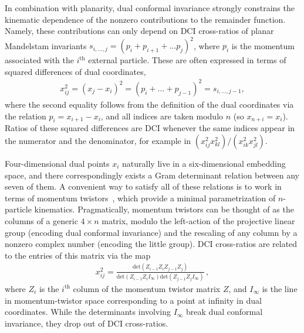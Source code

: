 \documentclass[11pt]{article}
\begin{document}
In combination with planarity, dual conformal invariance strongly constrains the kinematic dependence of the nonzero contributions to the remainder function. Namely, these contributions can only depend on DCI cross-ratios of planar Mandelstam invariants $s_{i,\dots,j} = (p_i + p_{i+1} + \dots p_{j})^2$, where $p_i$ is the momentum associated with the $i^{\text{th}}$ external particle. These are often expressed in terms of squared differences of dual coordinates, 
\begin{align}
x_{ij}^2 = (x_j - x_i)^2 = (p_i+ \dots + p_{j-1})^2 = s_{i,\dots,j-1},
\end{align}
where the second equality follows from the definition of the dual coordinates via the relation $p_i = x_{i+1} - x_i$, and all indices are taken modulo $n$ (so $x_{n+i} = x_i$). Ratios of these squared differences are DCI whenever the same indices appear in the numerator and the denominator, for example in $(x_{ij}^2 x_{kl}^2)/(x_{ik}^2 x_{jl}^2)$.  

Four-dimensional dual points $x_i$ naturally live in a six-dimensional embedding space, and there correspondingly exists a Gram determinant relation between any seven of them. A convenient way to satisfy all of these relations is to work in terms of momentum twistors~\cite{Hodges:2009hk}, which provide a minimal parametrization of $n$-particle kinematics. Pragmatically, momentum twistors can be thought of as the columns of a generic $4\! \times \! n$ matrix, modulo the left-action of the projective linear group (encoding dual conformal invariance) and the rescaling of any column by a nonzero complex number (encoding the little group). DCI cross-ratios are related to the entries of this matrix via the map
\begin{align}
x_{ij}^2 = \frac{\text{det}(Z_{i-1} Z_i Z_{j-1} Z_j)}{\text{det}(Z_{i-1} Z_i I_\infty) \text{det}(Z_{j-1} Z_j I_\infty)}  \, ,
\end{align} 
where $Z_i$ is the $i^\text{th}$ column of the momentum twistor matrix $Z$, and $I_\infty$ is the line in momentum-twistor space corresponding to a point at infinity in dual coordinates. While the determinants involving $I_\infty$ break dual conformal invariance, they drop out of DCI cross-ratios. 
\end{document}
